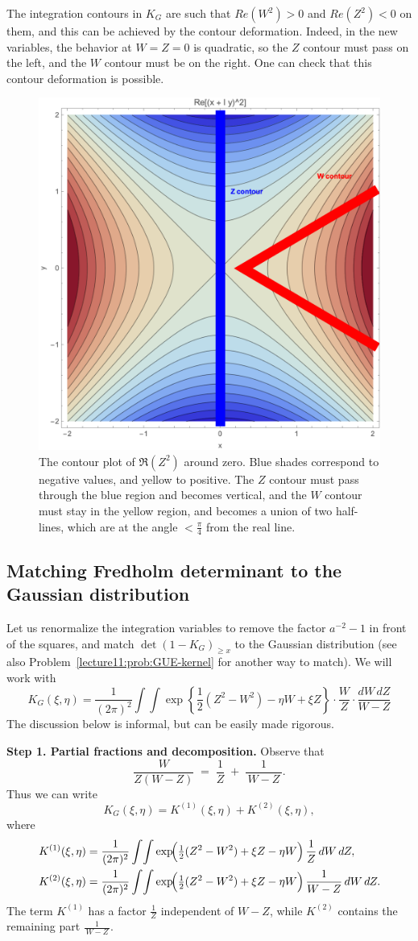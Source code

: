 \documentclass[letterpaper,11pt,oneside,reqno]{book}
\numberwithin{equation}{chapter}  %
\theoremstyle{definition}
\begin{document}
The integration contours in $K_G$ are
such that $Re (W^2)>0$ and $Re (Z^2)<0$ on them, and this can be achieved by
the contour deformation.
Indeed, in the new variables, the
behavior at $W=Z=0$ is quadratic, so the
$Z$ contour must pass on the left, and the $W$ contour must be on the right.
One can check that this contour deformation is possible.

\begin{figure}[htpb]
    \centering
    \includegraphics[height=.4\textwidth]{pictures/ReS_Gauss.png}
    \caption{The contour plot of
		$\Re(Z^2)$ around zero. Blue shades correspond to negative values, and yellow to positive. The
		$Z$ contour must pass through the blue region and becomes vertical, and the
		$W$ contour must stay in the yellow region, and becomes a union of two half-lines,
		which are at the angle $<\frac{\pi}{4}$ from the real line.}
		\label{lecture11:fig:ReS_Gauss}
\end{figure}

\subsection{Matching Fredholm determinant to the Gaussian distribution}
\label{lecture11:sec:matching-Gaussian}

Let us renormalize the integration variables
to remove the factor $a^{-2}-1$ in front of the squares,
and match $\det\left( 1-K_G \right)_{\ge x}$ to the Gaussian distribution
(see also Problem~\ref{lecture11:prob:GUE-kernel} for another way to match).
We will work with
\begin{equation*}
	K_G(\xi,\eta)=
	\frac{1}{(2\pi)^2}
	\int \int
	\exp\left\{
		\frac{1}{2}(Z^2-W^2)-\eta W+\xi Z
	\right\}\cdot
	\frac{W}{Z}\cdot
	\frac{dW\,dZ}{W-Z}
\end{equation*}
The discussion below is informal, but can be easily made rigorous.

\medskip

\noindent\textbf{Step 1. Partial fractions and decomposition.}
Observe that
\[
\frac{W}{Z(W-Z)} \;=\;
\frac{1}{Z}\;+\;\frac{1}{\,W-Z\,}.
\]
Thus we can write
\[
K_G(\xi,\eta)
=
K^{(1)}(\xi,\eta)+K^{(2)}(\xi,\eta),
\]
where
\begin{align*}
K^{(1)}(\xi,\eta)
&=
\frac{1}{(2\pi)^2}
\int\!\int
\exp\!\Bigl(\tfrac12(Z^2-W^2)+\xi Z-\eta W\Bigr)\,\frac{1}{Z}\,dW\,dZ,
\\
K^{(2)}(\xi,\eta)
&=
\frac{1}{(2\pi)^2}
\int\!\int
\exp\!\Bigl(\tfrac12(Z^2-W^2)+\xi Z-\eta W\Bigr)\,\frac{1}{W-Z}\,dW\,dZ.
\end{align*}
The term $K^{(1)}$ has a factor $\frac{1}{Z}$ independent of $W-Z$,
while $K^{(2)}$ contains the remaining part $\frac{1}{\,W-Z\,}$.
\end{document}
